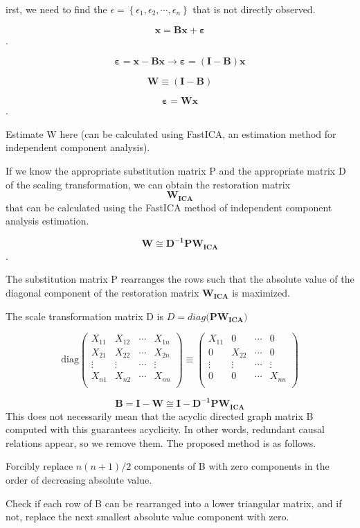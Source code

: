 \documentclass[pdftex]{article}
\begin{document}
irst, we need to find the $\epsilon=\left\{\epsilon_{1},\epsilon_{2},\cdots,\epsilon_{n}\right\}$ that is not directly observed.

$$\mathbf{x} = \mathbf{\text{Bx}} + \mathbf{\varepsilon}$$.

$$\mathbf{\varepsilon = x} - \mathbf{Bx \rightarrow \varepsilon =}\left( \mathbf{I - B}\right)\mathbf{x}$$

$$\mathbf{W \equiv}\left( \mathbf{I - B}\right)$$

$$\mathbf{\varepsilon = Wx}$$.

Estimate W here (can be calculated using FastICA, an estimation method for independent component analysis).

If we know the appropriate substitution matrix P and the appropriate matrix D of the scaling transformation, we can obtain the restoration matrix $$\mathbf{W}_{\mathbf{\text{ICA}}}$$ that can be calculated using the FastICA method of independent component analysis estimation.

$$\mathbf{W \cong}\mathbf{D}^{\mathbf{-1}}\mathbf{P}\mathbf{W}_{\mathbf{\text{ICA}}}$$.

The substitution matrix P rearranges the rows such that the absolute value of the diagonal component of the restoration matrix $\mathbf{W}_{\mathbf{\text{ICA}}}$ is maximized.

The scale transformation matrix D is $D = diag(\mathbf{P}\mathbf{W}_{\mathbf{\text{ICA}}}\mathbf{)}$

$$\text{diag}\begin{pmatrix}
X_{11} & X_{12} & \cdots & X_{1n} \\
X_{21} & X_{22} & \cdots & X_{2n} \\
 \vdots & \vdots & \cdots & \vdots \\
X_{n1} & X_{n2} & \cdots & X_{nn} \\
\end{pmatrix} \equiv \begin{pmatrix}
X_{11} & 0 & \cdots & 0 \\
0 & X_{22} & \cdots & 0 \\
 \vdots & \vdots & \cdots & \vdots \\
0 & 0 & \cdots & X_{nn} \\
\end{pmatrix}$$

$$\mathbf{B = I - W \cong I -}\mathbf{D}^{\mathbf{- 1}}\mathbf{P}\mathbf{W}_{\mathbf{\text{ICA}}}$$
This does not necessarily mean that the acyclic directed graph matrix B computed with this guarantees acyclicity. In other words, redundant causal relations appear, so we remove them. The proposed method is as follows.

Forcibly replace $n(n + 1)/2$ components of B with zero components in the order of decreasing absolute value.

Check if each row of B can be rearranged into a lower triangular matrix, and if not, replace the next smallest absolute value component with zero.
\end{document}
